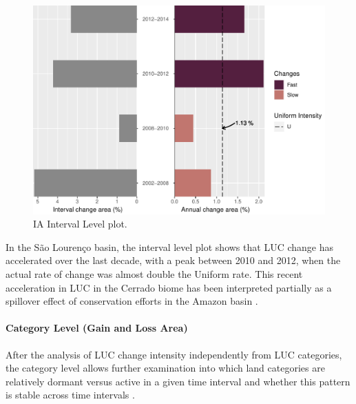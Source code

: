 \begin{Schunk}
\begin{figure}[h]

{\centering \includegraphics[width=0.6\linewidth,]{figures/interval_lvl.pdf} 

}

\caption[IA Interval Level plot]{IA Interval Level plot.}\label{fig:int_level}
\end{figure}
\end{Schunk}

In the São Lourenço basin, the interval level plot shows that LUC change
has accelerated over the last decade, with a peak between 2010 and 2012,
when the actual rate of change was almost double the Uniform rate. This
recent acceleration in LUC in the Cerrado biome has been interpreted
partially as a spillover effect of conservation efforts in the Amazon
basin \citep{Dou2018}.

\hypertarget{category-level-gain-and-loss-area}{%
\paragraph{Category Level (Gain and Loss
Area)}\label{category-level-gain-and-loss-area}}

After the analysis of LUC change intensity independently from LUC
categories, the category level allows further examination into which
land categories are relatively dormant versus active in a given time
interval and whether this pattern is stable across time intervals
\citep{Aldwaik2012}.

